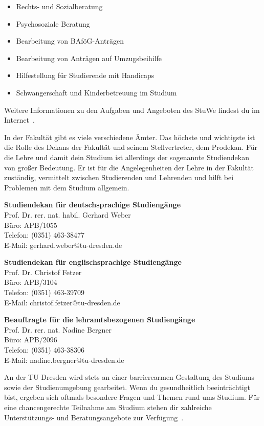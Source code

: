 \begin{itemize}
\item Rechts- und Sozialberatung
\item Psychosoziale Beratung
\item Bearbeitung von BAföG-Anträgen
\item Bearbeitung von Anträgen auf Umzugsbeihilfe
\item Hilfestellung für Studierende mit Handicaps
\item Schwangerschaft und Kinderbetreuung im Studium
\end{itemize}

Weitere Informationen zu den Aufgaben und Angeboten des StuWe findest du im Internet~.

In der Fakultät gibt es viele verschiedene Ämter.
Das höchste und wichtigste ist die Rolle des Dekans der Fakultät und seinem Stellvertreter, dem Prodekan.
Für die Lehre und damit dein Studium ist allerdings der sogenannte Studiendekan von großer Bedeutung.
Er ist für die Angelegenheiten der Lehre in der Fakultät zuständig, vermittelt zwischen Studierenden und Lehrenden und hilft bei Problemen mit dem Studium allgemein.

\textbf{Studiendekan für deutschsprachige Studiengänge}\\
Prof. Dr. rer. nat. habil. Gerhard Weber \\
Büro: APB/1055 \\
Telefon: (0351) 463-38477 \\
E-Mail: gerhard.weber@tu-dresden.de

\textbf{Studiendekan für englischsprachige Studiengänge}\\
Prof. Dr. Christof Fetzer \\
Büro: APB/3104 \\
Telefon: (0351) 463-39709 \\
E-Mail: christof.fetzer@tu-dresden.de

\textbf{Beauftragte für die lehramtsbezogenen Studiengänge}\\
Prof. Dr. rer. nat. Nadine Bergner \\
Büro: APB/2096 \\
Telefon: (0351) 463-38306 \\
E-Mail: nadine.bergner@tu-dresden.de


An der TU Dresden wird stets an einer barrierearmen Gestaltung des Studiums sowie der Studienumgebung gearbeitet.
Wenn du gesundheitlich beeinträchtigt bist, ergeben sich oftmals besondere Fragen und Themen rund ums Studium.
Für eine chancengerechte Teilnahme am Studium stehen dir zahlreiche Unterstützungs- und Beratungsangebote zur Verfügung~.


